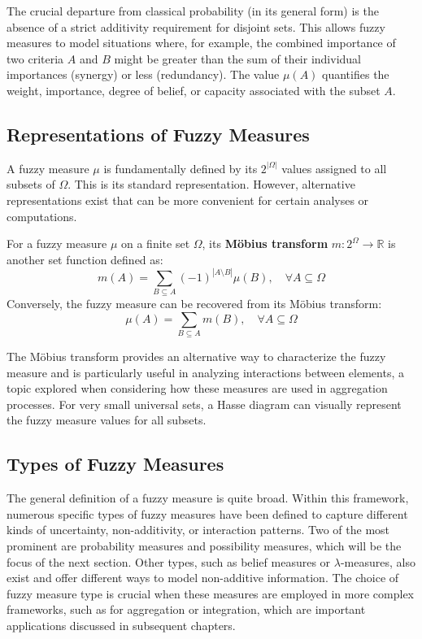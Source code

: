 The crucial departure from classical probability (in its general form) is the absence of a strict additivity requirement for disjoint sets. This allows fuzzy measures to model situations where, for example, the combined importance of two criteria $A$ and $B$ might be greater than the sum of their individual importances (synergy) or less (redundancy). The value $\mu(A)$ quantifies the weight, importance, degree of belief, or capacity associated with the subset $A$.

\subsection{Representations of Fuzzy Measures}
A fuzzy measure $\mu$ is fundamentally defined by its $2^{|\Omega|}$ values assigned to all subsets of $\Omega$. This is its standard representation. However, alternative representations exist that can be more convenient for certain analyses or computations.
\begin{definition}
For a fuzzy measure $\mu$ on a finite set $\Omega$, its \textbf{Möbius transform} $m: 2^\Omega \to \mathbb{R}$ is another set function defined as:
\[ m(A) = \sum_{B \subseteq A} (-1)^{|A \setminus B|} \mu(B), \quad \forall A \subseteq \Omega \]
Conversely, the fuzzy measure can be recovered from its Möbius transform:
\[ \mu(A) = \sum_{B \subseteq A} m(B), \quad \forall A \subseteq \Omega \]
\end{definition}
The Möbius transform provides an alternative way to characterize the fuzzy measure and is particularly useful in analyzing interactions between elements, a topic explored when considering how these measures are used in aggregation processes. For very small universal sets, a Hasse diagram can visually represent the fuzzy measure values for all subsets.

\subsection{Types of Fuzzy Measures}
The general definition of a fuzzy measure is quite broad. Within this framework, numerous specific types of fuzzy measures have been defined to capture different kinds of uncertainty, non-additivity, or interaction patterns. Two of the most prominent are probability measures and possibility measures, which will be the focus of the next section. Other types, such as belief measures or $\lambda$-measures, also exist and offer different ways to model non-additive information. The choice of fuzzy measure type is crucial when these measures are employed in more complex frameworks, such as for aggregation or integration, which are important applications discussed in subsequent chapters.

